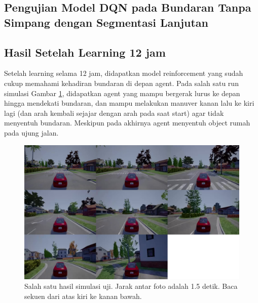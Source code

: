 \subsection{Pengujian Model DQN pada Bundaran Tanpa Simpang dengan Segmentasi Lanjutan}
\label{sec:pengujian_dqn_bundaran_nosimpang_segmentasi_hitam_putih}


\iffalse
\subsection{Hasil Setelah Learning 12 jam}
\label{sec:hasil_learning_12}
Setelah learning selama 12 jam, didapatkan model reinforcement yang sudah cukup memahami kehadiran bundaran di depan agent. Pada salah satu run simulasi Gambar \ref{fig:uji0}, didapatkan agent yang mampu bergerak lurus ke depan hingga mendekati bundaran, dan mampu melakukan manuver kanan lalu ke kiri lagi (dan arah kembali sejajar dengan arah pada saat start) agar tidak menyentuh bundaran. Meskipun pada akhirnya agent menyentuh object rumah pada ujung jalan.

\begin{figure}[H] 
	\centering
	\includegraphics[width=1\linewidth]{images/uji0}
	\caption{Salah satu hasil simulasi uji. Jarak antar foto adalah 1.5 detik. Baca sekuen dari atas kiri ke kanan bawah.}
	\label{fig:uji0}
\end{figure}

